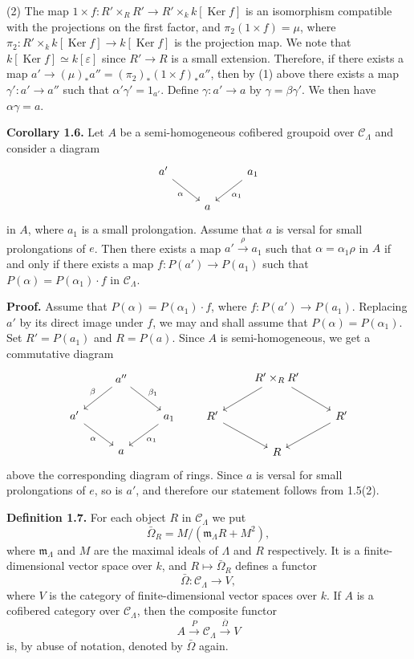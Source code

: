 \documentclass[11pt]{article}
\providecommand{\Ker}{\operatorname{Ker}}
\providecommand{\ma}{\mathfrak m_\Lambda}
\providecommand{\CL}{\mathcal C_\Lambda}
\begin{document}
(2) The map $1\times f:R'\times_RR'\to R'\times_k k[\Ker f]$ is an isomorphism compatible with the projections on the first factor, and $\pi_2(1\times f)=\mu$, where $\pi_2:R'\times_k k[\Ker f]\to k[\Ker f]$ is the projection map. We note that $k[\Ker f]\simeq k[\varepsilon]$ since $R'\to R$ is a small extension. Therefore, if there exists a map $a'\to(\mu)_*a''=(\pi_2)_*(1\times f)_*a''$, then by (1) above there exists a map $\gamma':a'\to a''$ such that $\alpha'\gamma'=1_{a'}$. Define $\gamma:a'\to a$ by $\gamma=\beta\gamma'$. We then have $\alpha\gamma=a$.

\textbf{Corollary 1.6.} Let $A$ be a semi-homogeneous cofibered groupoid over $\CL$ and consider a diagram
\[
\begin{tikzcd}
 a' \arrow[dr,"\alpha"'] && a_1 \arrow[dl,"\alpha_1"]\\
& a &
\end{tikzcd}
\]
in $A$, where $a_1$ is a small prolongation. Assume that $a$ is versal for small prolongations of $e$. Then there exists a map $a'\xrightarrow{\rho}a_1$ such that $\alpha=\alpha_1\rho$ in $A$ if and only if there exists a map $f:P(a')\to P(a_1)$ such that $P(\alpha)=P(\alpha_1)\cdot f$ in $\CL$.

\textbf{Proof.} Assume that $P(\alpha)=P(\alpha_1)\cdot f$, where $f:P(a')\to P(a_1)$. Replacing $a'$ by its direct image under $f$, we may and shall assume that $P(\alpha)=P(\alpha_1)$. Set $R'=P(a_1)$ and $R=P(a)$. Since $A$ is semi-homogeneous, we get a commutative diagram
\[
\begin{tikzcd}
& a'' \arrow[dl,"\beta"'] \arrow[dr,"\beta_1"] &\\
a' \arrow[dr,"\alpha"'] && a_1 \arrow[dl,"\alpha_1"]\\
& a &
\end{tikzcd}
\qquad
\begin{tikzcd}
& R'\times_R R' \arrow[dl] \arrow[dr] &\\
R' \arrow[dr] && R' \arrow[dl]\\
& R &
\end{tikzcd}
\]
above the corresponding diagram of rings. Since $a$ is versal for small prolongations of $e$, so is $a'$, and therefore our statement follows from 1.5(2).

\textbf{Definition 1.7.} For each object $R$ in $\CL$ we put
\[
 \bar\Omega_R=M/(\ma R+M^2),
\]
where $\ma$ and $M$ are the maximal ideals of $\Lambda$ and $R$ respectively. It is a finite-dimensional vector space over $k$, and $R\mapsto\bar\Omega_R$ defines a functor
\[
 \bar\Omega:\CL\longrightarrow V,
\]
where $V$ is the category of finite-dimensional vector spaces over $k$. If $A$ is a cofibered category over $\CL$, then the composite functor
\[
 A\xrightarrow{P}\CL\xrightarrow{\bar\Omega}V
\]
is, by abuse of notation, denoted by $\bar\Omega$ again.
\end{document}
